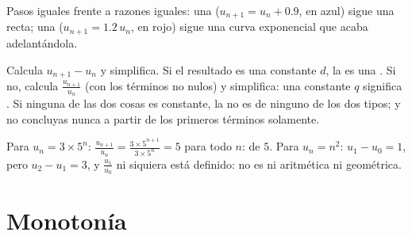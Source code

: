 \begin{omfigure}

{\small Pasos iguales frente a razones iguales: una 
($u_{n+1} = u_n + 0.9$, en azul) sigue una recta; una  ($u_{n+1} = 1.2\,u_n$, en rojo) sigue una curva exponencial que
acaba adelantándola.}
\end{omfigure}

\begin{method}\label{met:g11:seq:recognize}
Calcula $u_{n+1} - u_n$ y simplifica. Si el resultado es una constante
$d$, la  es una . Si no, calcula
$\frac{u_{n+1}}{u_n}$ (con los términos no nulos) y simplifica: una
constante $q$ significa . Si ninguna de las dos
cosas es constante, la  no es de ninguno de los dos tipos; y no
concluyas nunca a partir de los primeros términos solamente.
\end{method}

\begin{example}
Para $u_n = 3 \times 5^n$:
$\frac{u_{n+1}}{u_n} = \frac{3 \times 5^{n+1}}{3 \times 5^n} = 5$ para
todo $n$:  de  $5$. Para $u_n = n^2$:
$u_1 - u_0 = 1$, pero $u_2 - u_1 = 3$, y $\frac{u_1}{u_0}$ ni siquiera
está definido: no es ni aritmética ni geométrica.
\end{example}

\section{Monotonía}

